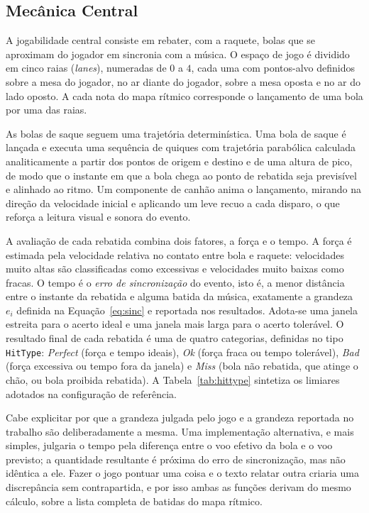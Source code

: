 \subsection{Mecânica Central}\label{subsec:mecanica}

A jogabilidade central consiste em rebater, com a raquete, bolas que se aproximam do jogador em sincronia com a música. O espaço de jogo é dividido em cinco raias (\textit{lanes}), numeradas de $0$ a $4$, cada uma com pontos-alvo definidos sobre a mesa do jogador, no ar diante do jogador, sobre a mesa oposta e no ar do lado oposto. A cada nota do mapa rítmico corresponde o lançamento de uma bola por uma das raias.

As bolas de saque seguem uma trajetória determinística. Uma bola de saque é lançada e executa uma sequência de quiques com trajetória parabólica calculada analiticamente a partir dos pontos de origem e destino e de uma altura de pico, de modo que o instante em que a bola chega ao ponto de rebatida seja previsível e alinhado ao ritmo. Um componente de canhão anima o lançamento, mirando na direção da velocidade inicial e aplicando um leve recuo a cada disparo, o que reforça a leitura visual e sonora do evento.

A avaliação de cada rebatida combina dois fatores, a força e o tempo. A força é estimada pela velocidade relativa no contato entre bola e raquete: velocidades muito altas são classificadas como excessivas e velocidades muito baixas como fracas. O tempo é o \emph{erro de sincronização} do evento, isto é, a menor distância entre o instante da rebatida e alguma batida da música, exatamente a grandeza $e_i$ definida na Equação~\ref{eq:sinc} e reportada nos resultados. Adota-se uma janela estreita para o acerto ideal e uma janela mais larga para o acerto tolerável. O resultado final de cada rebatida é uma de quatro categorias, definidas no tipo \texttt{HitType}: \textit{Perfect} (força e tempo ideais), \textit{Ok} (força fraca ou tempo tolerável), \textit{Bad} (força excessiva ou tempo fora da janela) e \textit{Miss} (bola não rebatida, que atinge o chão, ou bola proibida rebatida). A Tabela~\ref{tab:hittype} sintetiza os limiares adotados na configuração de referência.

Cabe explicitar por que a grandeza julgada pelo jogo e a grandeza reportada no trabalho são deliberadamente a mesma. Uma implementação alternativa, e mais simples, julgaria o tempo pela diferença entre o voo efetivo da bola e o voo previsto; a quantidade resultante é próxima do erro de sincronização, mas não idêntica a ele. Fazer o jogo pontuar uma coisa e o texto relatar outra criaria uma discrepância sem contrapartida, e por isso ambas as funções derivam do mesmo cálculo, sobre a lista completa de batidas do mapa rítmico.

